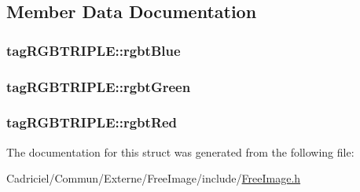 \subsection{Member Data Documentation}
\hypertarget{structtag_r_g_b_t_r_i_p_l_e_adbebf9e7802cdfffbdae31c08a71dab7}{
\subsubsection[{rgbt\-Blue}]{ tag\-R\-G\-B\-T\-R\-I\-P\-L\-E\-::rgbt\-Blue}}\label{structtag_r_g_b_t_r_i_p_l_e_adbebf9e7802cdfffbdae31c08a71dab7}
\hypertarget{structtag_r_g_b_t_r_i_p_l_e_a2e3e106422819352693de65189cc341f}{
\subsubsection[{rgbt\-Green}]{ tag\-R\-G\-B\-T\-R\-I\-P\-L\-E\-::rgbt\-Green}}\label{structtag_r_g_b_t_r_i_p_l_e_a2e3e106422819352693de65189cc341f}
\hypertarget{structtag_r_g_b_t_r_i_p_l_e_ae61b0771fd3e1e267a3495dcfba5e21c}{
\subsubsection[{rgbt\-Red}]{ tag\-R\-G\-B\-T\-R\-I\-P\-L\-E\-::rgbt\-Red}}\label{structtag_r_g_b_t_r_i_p_l_e_ae61b0771fd3e1e267a3495dcfba5e21c}


The documentation for this struct was generated from the following file\-:\begin{DoxyCompactItemize}
\item 
Cadriciel/\-Commun/\-Externe/\-Free\-Image/include/\hyperlink{_free_image_8h}{Free\-Image.\-h}\end{DoxyCompactItemize}
